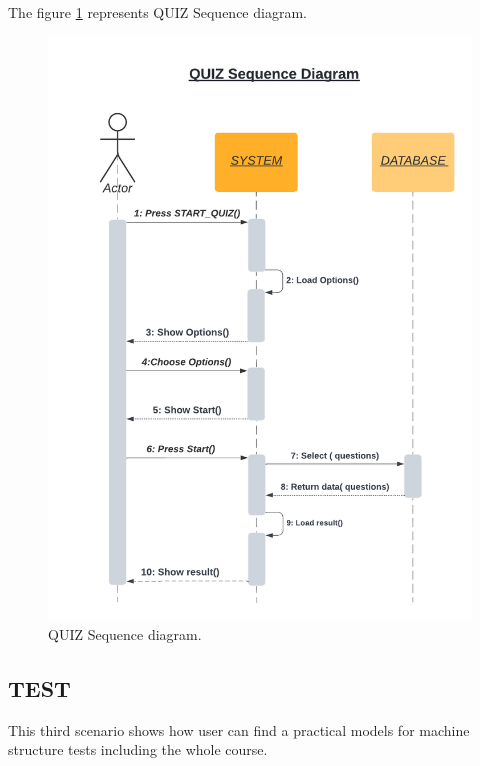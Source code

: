 \newpage
The figure \ref{fig:QUIZ DS} represents QUIZ Sequence diagram.
\begin{figure}[ht]
	\centering
	\label{}\includegraphics[scale=0.7]{img/Quiz Sequence diagram.pdf}                
	\caption{QUIZ Sequence diagram.} 
	\label{fig:QUIZ DS}
\end{figure} 







\subsection{TEST}
This third scenario shows how user can find a practical models for machine structure tests including the whole course.
\newpage


